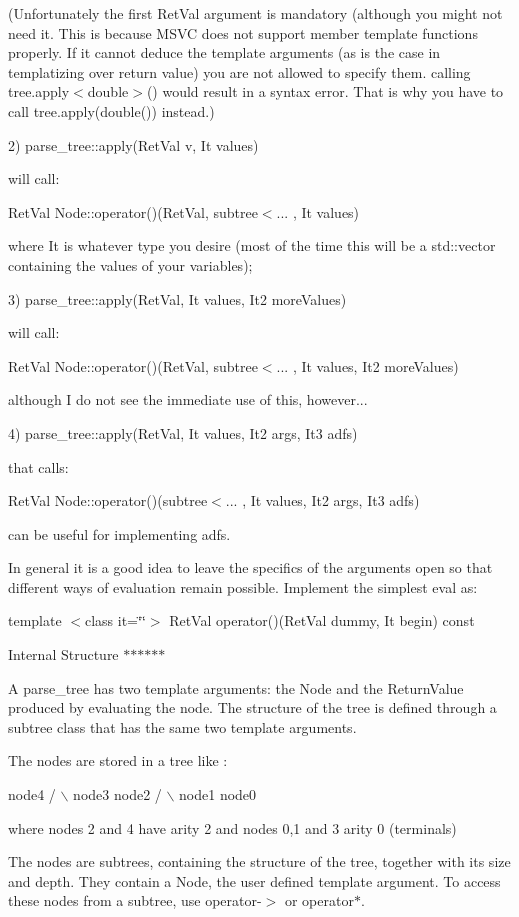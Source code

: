 (Unfortunately the first Ret\-Val argument is mandatory (although you might not need it. This is because MSVC does not support member template functions properly. If it cannot deduce the template arguments (as is the case in templatizing over return value) you are not allowed to specify them. calling tree.apply$<$double$>$() would result in a syntax error. That is why you have to call tree.apply(double()) instead.)

2) parse\_\-tree::apply(Ret\-Val v, It values)

will call:

Ret\-Val Node::operator()(Ret\-Val, subtree$<$... , It values)

where It is whatever type you desire (most of the time this will be a std::vector containing the values of your variables);

3) parse\_\-tree::apply(Ret\-Val, It values, It2 more\-Values)

will call:

Ret\-Val Node::operator()(Ret\-Val, subtree$<$... , It values, It2 more\-Values)

although I do not see the immediate use of this, however...

4) parse\_\-tree::apply(Ret\-Val, It values, It2 args, It3 adfs)

that calls:

Ret\-Val Node::operator()(subtree$<$... , It values, It2 args, It3 adfs)

can be useful for implementing adfs.

In general it is a good idea to leave the specifics of the arguments open so that different ways of evaluation remain possible. Implement the simplest eval as:

template $<$class it=\char`\"{}\char`\"{}$>$ Ret\-Val operator()(Ret\-Val dummy, It begin) const

Internal Structure $\ast$$\ast$$\ast$$\ast$$\ast$$\ast$

A parse\_\-tree has two template arguments: the Node and the Return\-Value produced by evaluating the node. The structure of the tree is defined through a subtree class that has the same two template arguments.

The nodes are stored in a tree like :

node4 / $\backslash$ node3 node2 / $\backslash$ node1 node0

where nodes 2 and 4 have arity 2 and nodes 0,1 and 3 arity 0 (terminals)

The nodes are subtrees, containing the structure of the tree, together with its size and depth. They contain a Node, the user defined template argument. To access these nodes from a subtree, use operator-$>$ or operator$\ast$.

